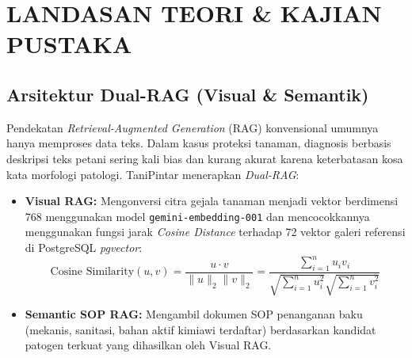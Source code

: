 \documentclass[11pt,a4paper]{article}
\begin{document}
\section{LANDASAN TEORI \& KAJIAN PUSTAKA}

\subsection{Arsitektur Dual-RAG (Visual \& Semantik)}
Pendekatan \textit{Retrieval-Augmented Generation} (RAG) konvensional umumnya hanya memproses data teks. Dalam kasus proteksi tanaman, diagnosis berbasis deskripsi teks petani sering kali bias dan kurang akurat karena keterbatasan kosa kata morfologi patologi. TaniPintar menerapkan \textit{Dual-RAG}:
\begin{itemize}
    \item \textbf{Visual RAG:} Mengonversi citra gejala tanaman menjadi vektor berdimensi 768 menggunakan model \texttt{gemini-embedding-001} dan mencocokkannya menggunakan fungsi jarak \textit{Cosine Distance} terhadap 72 vektor galeri referensi di PostgreSQL \textit{pgvector}:
    \begin{equation}
        \text{Cosine Similarity}(u, v) = \frac{u \cdot v}{\|u\|_2 \|v\|_2} = \frac{\sum_{i=1}^{n} u_i v_i}{\sqrt{\sum_{i=1}^{n} u_i^2} \sqrt{\sum_{i=1}^{n} v_i^2}}
    \end{equation}
    \item \textbf{Semantic SOP RAG:} Mengambil dokumen SOP penanganan baku (mekanis, sanitasi, bahan aktif kimiawi terdaftar) berdasarkan kandidat patogen terkuat yang dihasilkan oleh Visual RAG.
\end{itemize}
\end{document}
